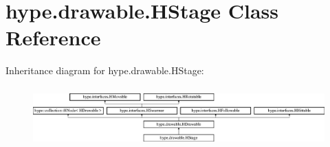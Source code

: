 \hypertarget{classhype_1_1drawable_1_1_h_stage}{\section{hype.\-drawable.\-H\-Stage Class Reference}
\label{classhype_1_1drawable_1_1_h_stage}
}
Inheritance diagram for hype.\-drawable.\-H\-Stage\-:\begin{figure}[H]
\begin{center}
\leavevmode
\includegraphics[height=2.333333cm]{classhype_1_1drawable_1_1_h_stage}
\end{center}
\end{figure}
